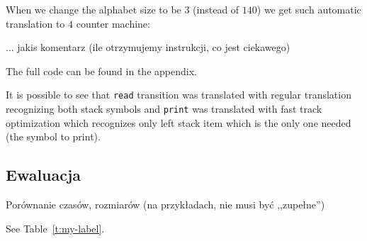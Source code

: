 \documentclass[english,shortabstract,mgr]{iithesis}
\begin{document}
When we change the alphabet size to be $3$ (instead of $140$) we get such
automatic translation to $4$ counter machine:

... jakis komentarz (ile otrzymujemy instrukcji, co jest ciekawego)

The full code can be found in the appendix.

It is possible to see that \texttt{read} transition was translated with
regular translation recognizing both stack symbols and \texttt{print}
was translated with fast track optimization which recognizes only
left stack item which is the only one needed (the symbol to print).

\newpage

\subsection{Ewaluacja}

Porównanie czasów, rozmiarów (na przykładach, nie musi być ,,zupełne'')

See Table~\ref{t:my-label}.
\end{document}
